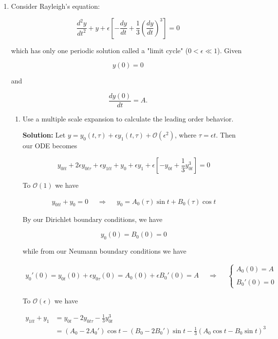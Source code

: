 \documentclass[12pt, a4paper]{article}
\begin{document}
\begin{enumerate}
\begin{enumerate}
\end{enumerate}

\item Consider Rayleigh's equation:

$$\frac{d^2 y}{dt^2} + y + \epsilon \left[ - \frac{dy}{dt}+\frac{1}{3} \left( \frac{dy}{dt}\right)^3 \right] = 0$$

which has only one periodic solution called a "limit cycle" ($0 < \epsilon \ll 1$). Given

$$y(0)=0$$

and 

$$\frac{dy(0)}{dt}=A.$$

\begin{enumerate}
    \item Use a multiple scale expansion to calculate the leading order behavior.

    \textbf{Solution:} Let $y = y_0(t, \tau) + \epsilon y_1(t,\tau) + \mathcal{O}(\epsilon^2)$, where $\tau = \epsilon t$. Then our ODE becomes

    $$y_{0tt} + 2 \epsilon y_{0t\tau} + \epsilon y_{1tt} + y_0 + \epsilon y_1 + \epsilon[-y_{0t} + \frac{1}{3} y_{0t}^3]=0$$

    To $\mathcal{O}(1)$ we have

    \begin{align*}
        y_{0tt}+y_0=0 && \Rightarrow && y_0 = A_0(\tau) \sin t + B_0(\tau) \cos t
    \end{align*}

    By our Dirichlet boundary conditions, we have

    $$y_0(0) = B_0(0) = 0$$
    
    while from our Neumann boundary conditions we have

    \begin{align*}
        y_0'(0) = y_{0t}(0) + \epsilon y_{0\tau}(0) =  A_0(0) + \epsilon B_0'(0)  = A && \Rightarrow && \left\{ \begin{array}{cc}
           A_0(0) = A \\\\
           B_0'(0) = 0
        \end{array}\right.
    \end{align*}
    
    To $\mathcal{O}(\epsilon)$ we have

    \begin{align*}
        y_{1tt} + y_1 &= y_{0t} - 2y_{0t\tau} - \frac{1}{3} y_{0t}^3\\
        &= (A_0 -2A_{0}') \cos t - (B_0-2B_{0}') \sin t - \frac{1}{3}(A_0 \cos t - B_0 \sin t)^3
    \end{align*}


\end{enumerate}
\end{enumerate}
\end{document}

